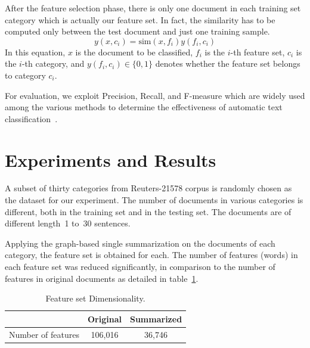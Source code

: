 \documentclass{sigchi}
\begin{document}
After the feature selection phase, there is only one document in each training set category which is actually our feature set. 
In fact, the similarity has to be computed only between the test document and just one training sample.
\begin{equation}
 y(x,c_i)=\mbox{sim}(x,f_i)y(f_i,c_i)
\end{equation}
In this equation, $x$ is the document to be classified, $f_i$ is the $i$-th feature set, $c_i$ is the $i$-th category, and $y(f_i,c_i)\in\{0,1\}$ denotes whether the feature set belongs to category $c_i$.

For evaluation, we exploit Precision, Recall, and F-measure which are widely used among the various methods to determine the effectiveness of automatic text classification~\cite{ikonomakis2005text, 5950}.

\section{Experiments and Results}\label{sectionExperiments}
A subset of thirty categories from Reuters-21578 corpus is randomly chosen as the dataset for our experiment. 
The number of documents in various categories is different, both in the training set and in the testing set. 
The documents are of different length~1 to~30 sentences.

Applying the graph-based single summarization on the documents of each category, the feature set is obtained for each. 
The number of features (words) in each feature set was reduced significantly, in comparison to the number of features in original documents as detailed in table~\ref{tableFeatureSetDimensionality}.
\begin{table}
  \centering
  \begin{tabular}{lcc}
    \toprule
    & Original & Summarized \\
    \midrule
    Number of features & 106,016 & 36,746 \\
    \bottomrule
  \end{tabular}
  \caption{Feature set Dimensionality.}~\label{tableFeatureSetDimensionality}
\end{table}
\end{document}
